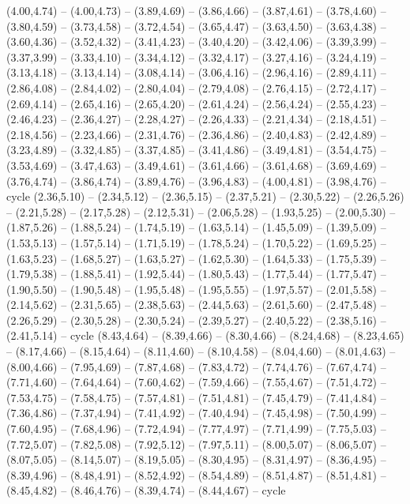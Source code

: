 \expandafter\def\csname geo:gebiet:USA\endcsname{
  (4.00,4.74) -- (4.00,4.73) -- (3.89,4.69) -- (3.86,4.66) -- (3.87,4.61) -- (3.78,4.60) -- (3.80,4.59) -- (3.73,4.58) -- (3.72,4.54) -- (3.65,4.47) -- (3.63,4.50) -- (3.63,4.38) -- (3.60,4.36) -- (3.52,4.32) -- (3.41,4.23) -- (3.40,4.20) -- (3.42,4.06) -- (3.39,3.99) -- (3.37,3.99) -- (3.33,4.10) -- (3.34,4.12) -- (3.32,4.17) -- (3.27,4.16) -- (3.24,4.19) -- (3.13,4.18) -- (3.13,4.14) -- (3.08,4.14) -- (3.06,4.16) -- (2.96,4.16) -- (2.89,4.11) -- (2.86,4.08) -- (2.84,4.02) -- (2.80,4.04) -- (2.79,4.08) -- (2.76,4.15) -- (2.72,4.17) -- (2.69,4.14) -- (2.65,4.16) -- (2.65,4.20) -- (2.61,4.24) -- (2.56,4.24) -- (2.55,4.23) -- (2.46,4.23) -- (2.36,4.27) -- (2.28,4.27) -- (2.26,4.33) -- (2.21,4.34) -- (2.18,4.51) -- (2.18,4.56) -- (2.23,4.66) -- (2.31,4.76) -- (2.36,4.86) -- (2.40,4.83) -- (2.42,4.89) -- (3.23,4.89) -- (3.32,4.85) -- (3.37,4.85) -- (3.41,4.86) -- (3.49,4.81) -- (3.54,4.75) -- (3.53,4.69) -- (3.47,4.63) -- (3.49,4.61) -- (3.61,4.66) -- (3.61,4.68) -- (3.69,4.69) -- (3.76,4.74) -- (3.86,4.74) -- (3.89,4.76) -- (3.96,4.83) -- (4.00,4.81) -- (3.98,4.76) -- cycle
  (2.36,5.10) -- (2.34,5.12) -- (2.36,5.15) -- (2.37,5.21) -- (2.30,5.22) -- (2.26,5.26) -- (2.21,5.28) -- (2.17,5.28) -- (2.12,5.31) -- (2.06,5.28) -- (1.93,5.25) -- (2.00,5.30) -- (1.87,5.26) -- (1.88,5.24) -- (1.74,5.19) -- (1.63,5.14) -- (1.45,5.09) -- (1.39,5.09) -- (1.53,5.13) -- (1.57,5.14) -- (1.71,5.19) -- (1.78,5.24) -- (1.70,5.22) -- (1.69,5.25) -- (1.63,5.23) -- (1.68,5.27) -- (1.63,5.27) -- (1.62,5.30) -- (1.64,5.33) -- (1.75,5.39) -- (1.79,5.38) -- (1.88,5.41) -- (1.92,5.44) -- (1.80,5.43) -- (1.77,5.44) -- (1.77,5.47) -- (1.90,5.50) -- (1.90,5.48) -- (1.95,5.48) -- (1.95,5.55) -- (1.97,5.57) -- (2.01,5.58) -- (2.14,5.62) -- (2.31,5.65) -- (2.38,5.63) -- (2.44,5.63) -- (2.61,5.60) -- (2.47,5.48) -- (2.26,5.29) -- (2.30,5.28) -- (2.30,5.24) -- (2.39,5.27) -- (2.40,5.22) -- (2.38,5.16) -- (2.41,5.14) -- cycle}
\expandafter\def\csname geo:gebiet:KAZ\endcsname{
  (8.43,4.64) -- (8.39,4.66) -- (8.30,4.66) -- (8.24,4.68) -- (8.23,4.65) -- (8.17,4.66) -- (8.15,4.64) -- (8.11,4.60) -- (8.10,4.58) -- (8.04,4.60) -- (8.01,4.63) -- (8.00,4.66) -- (7.95,4.69) -- (7.87,4.68) -- (7.83,4.72) -- (7.74,4.76) -- (7.67,4.74) -- (7.71,4.60) -- (7.64,4.64) -- (7.60,4.62) -- (7.59,4.66) -- (7.55,4.67) -- (7.51,4.72) -- (7.53,4.75) -- (7.58,4.75) -- (7.57,4.81) -- (7.51,4.81) -- (7.45,4.79) -- (7.41,4.84) -- (7.36,4.86) -- (7.37,4.94) -- (7.41,4.92) -- (7.40,4.94) -- (7.45,4.98) -- (7.50,4.99) -- (7.60,4.95) -- (7.68,4.96) -- (7.72,4.94) -- (7.77,4.97) -- (7.71,4.99) -- (7.75,5.03) -- (7.72,5.07) -- (7.82,5.08) -- (7.92,5.12) -- (7.97,5.11) -- (8.00,5.07) -- (8.06,5.07) -- (8.07,5.05) -- (8.14,5.07) -- (8.19,5.05) -- (8.30,4.95) -- (8.31,4.97) -- (8.36,4.95) -- (8.39,4.96) -- (8.48,4.91) -- (8.52,4.92) -- (8.54,4.89) -- (8.51,4.87) -- (8.51,4.81) -- (8.45,4.82) -- (8.46,4.76) -- (8.39,4.74) -- (8.44,4.67) -- cycle}
